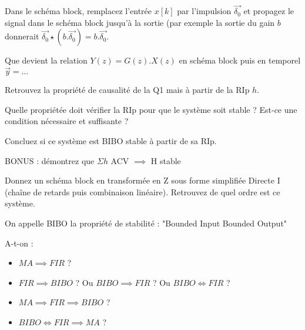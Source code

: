 Dans le schéma block, remplacez l'entrée $x[k]$ par l'impulsion
$\vec{\delta_0}$ et propagez le signal dans le schéma block jusqu'à la
sortie (par exemple la sortie du gain $b$ donnerait
$\vec{\delta_0} \star (b.\vec{\delta_0}) = b.\vec{\delta_0}$.

Que devient la relation $Y(z) = G(z) . X(z)$ en schéma block puis en
temporel $\vec{y} = \dots$



Retrouvez la propriété de causalité de la Q1 mais à partir de la RIp $h$. 



Quelle propriétée doit vérifier la RIp pour que le système soit stable
? Est-ce une condition nécessaire et suffisante ?

Concluez si ce système est BIBO stable à partir de sa RIp.

BONUS : démontrez que $\Sigma h$ ACV $\implies$ H stable


Donnez un schéma block en transformée en Z sous forme simplifiée Directe I (chaîne de retards puis combinaison linéaire). Retrouvez de quel ordre est ce système.

On appelle BIBO la propriété de stabilité : "Bounded Input Bounded Output"

A-t-on :

\begin{itemize}
\item  $MA \implies FIR$ ?  
\item $FIR \implies BIBO$ ? Ou $BIBO \implies FIR$ ? Ou $BIBO \iff FIR$ ?  
\item $MA \implies FIR \implies BIBO$ ?  
\item $BIBO \iff FIR \implies MA$ ?  
\end{itemize}

